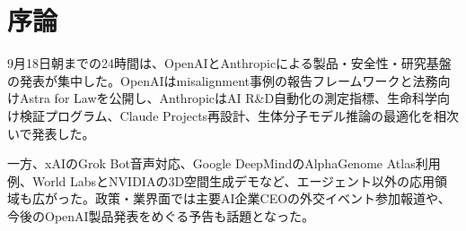 \section*{序論}
9月18日朝までの24時間は、OpenAIとAnthropicによる製品・安全性・研究基盤の発表が集中した。OpenAIはmisalignment事例の報告フレームワークと法務向けAstra for Lawを公開し、AnthropicはAI R\&D自動化の測定指標、生命科学向け検証プログラム、Claude Projects再設計、生体分子モデル推論の最適化を相次いで発表した。

一方、xAIのGrok Bot音声対応、Google DeepMindのAlphaGenome Atlas利用例、World LabsとNVIDIAの3D空間生成デモなど、エージェント以外の応用領域も広がった。政策・業界面では主要AI企業CEOの外交イベント参加報道や、今後のOpenAI製品発表をめぐる予告も話題となった。
